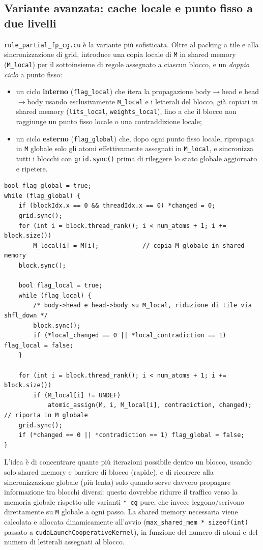 \documentclass[11pt,a4paper]{article}
\begin{document}
\subsection{Variante avanzata: cache locale e punto fisso a due livelli}

\texttt{rule\_partial\_fp\_cg.cu} è la variante più sofisticata. Oltre al packing a tile e alla
sincronizzazione di grid, introduce una copia locale di \texttt{M} in shared memory
(\texttt{M\_local}) per il sottoinsieme di regole assegnato a ciascun blocco, e un \emph{doppio
ciclo} a punto fisso:

\begin{itemize}
\item un ciclo \textbf{interno} (\texttt{flag\_local}) che itera la propagazione body$\to$head e
head$\to$body usando esclusivamente \texttt{M\_local} e i letterali del blocco, già copiati in
shared memory (\texttt{lits\_local}, \texttt{weights\_local}), fino a che il blocco non raggiunge un
punto fisso locale o una contraddizione locale;
\item un ciclo \textbf{esterno} (\texttt{flag\_global}) che, dopo ogni punto fisso locale,
ripropaga in \texttt{M} globale solo gli atomi effettivamente assegnati in \texttt{M\_local}, e
sincronizza tutti i blocchi con \texttt{grid.sync()} prima di rileggere lo stato globale aggiornato
e ripetere.
\end{itemize}

\begin{lstlisting}
bool flag_global = true;
while (flag_global) {
    if (blockIdx.x == 0 && threadIdx.x == 0) *changed = 0;
    grid.sync();
    for (int i = block.thread_rank(); i < num_atoms + 1; i += block.size())
        M_local[i] = M[i];            // copia M globale in shared memory
    block.sync();

    bool flag_local = true;
    while (flag_local) {
        /* body->head e head->body su M_local, riduzione di tile via shfl_down */
        block.sync();
        if (*local_changed == 0 || *local_contradiction == 1) flag_local = false;
    }

    for (int i = block.thread_rank(); i < num_atoms + 1; i += block.size())
        if (M_local[i] != UNDEF)
            atomic_assign(M, i, M_local[i], contradiction, changed);  // riporta in M globale
    grid.sync();
    if (*changed == 0 || *contradiction == 1) flag_global = false;
}
\end{lstlisting}

L'idea è di concentrare quante più iterazioni possibile dentro un blocco, usando solo shared memory
e barriere di blocco (rapide), e di ricorrere alla sincronizzazione globale (più lenta) solo quando
serve davvero propagare informazione tra blocchi diversi: questo dovrebbe ridurre il traffico verso
la memoria globale rispetto alle varianti \texttt{*\_cg} pure, che invece leggono/scrivono
direttamente su \texttt{M} globale a ogni passo. La shared memory necessaria viene calcolata e
allocata dinamicamente all'avvio (\texttt{max\_shared\_mem * sizeof(int)} passato a
\texttt{cudaLaunchCooperativeKernel}), in funzione del numero di atomi e del numero di letterali
assegnati al blocco.
\end{document}
